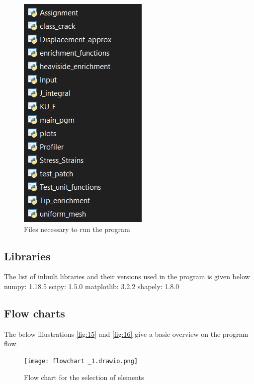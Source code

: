 \documentclass[fleqn, 12.5pt,a4paper]{report}
\begin{document}
\begin{figure}[H]
    \centering
    \includegraphics[scale =1]{ppp_files.PNG}
    \caption{Files necessary to run the program}
    \centering
\end{figure}

\subsection{Libraries}
The list of inbuilt libraries and their versions used in the program is given below
\\
numpy: 1.18.5 \newline
scipy: 1.5.0 \newline
matplotlib: 3.2.2 \newline
shapely: 1.8.0 \newline

\subsection{Flow charts}
The below illustrations \autoref{fig:15} and \autoref{fig:16} give a basic overview on the program flow.
\begin{figure}[H]
    \centering
    \texttt{[image: flowchart \_1.drawio.png]}
    \vspace{0.5cm}
    \caption{Flow chart for the selection of elements}
    \label{fig:15}
\end{figure}
\end{document}
